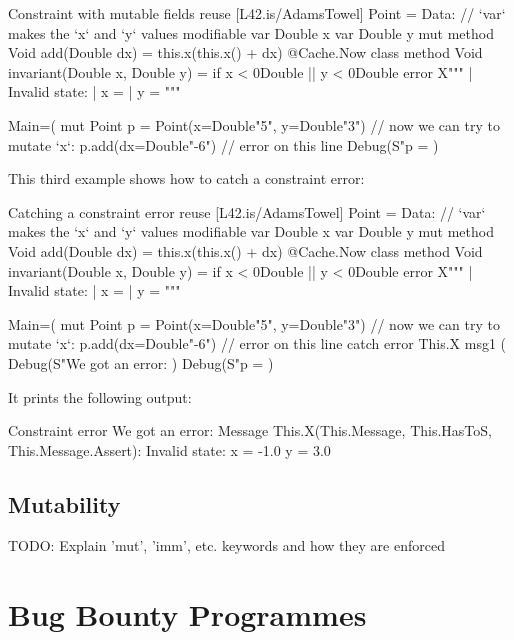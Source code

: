 \begin{mylisting}{Constraint with mutable fields}
reuse [L42.is/AdamsTowel]
Point = Data:{
  // `var` makes the `x` and `y` values modifiable
  var Double x
  var Double y
  mut method Void add(Double dx) = 
    this.x(this.x() + dx)
  @Cache.Now class method Void invariant(Double x, Double y) = 
    if x < 0Double || y < 0Double error X"""%
      | Invalid state:
      | x = %
      | y = %
      """
  }

Main=(
  mut Point p = Point(x=Double"5", y=Double"3")
  // now we can try to mutate `x`:
  p.add(dx=Double"-6") // error on this line
  Debug(S"p = %
  )
\end{mylisting}

This third example shows how to catch a constraint error:

\begin{mylisting}{Catching a constraint error}
reuse [L42.is/AdamsTowel]
Point = Data:{
  // `var` makes the `x` and `y` values modifiable
  var Double x
  var Double y
  mut method Void add(Double dx) = 
    this.x(this.x() + dx)
  @Cache.Now class method Void invariant(Double x, Double y) = 
    if x < 0Double || y < 0Double error X"""%
      | Invalid state:
      | x = %
      | y = %
      """
  }

Main=(
  mut Point p = Point(x=Double"5", y=Double"3")
  // now we can try to mutate `x`:
  p.add(dx=Double"-6") // error on this line
  catch error This.X msg1 (
     Debug(S"We got an error: %
     )
  Debug(S"p = %
  )
\end{mylisting}

It prints the following output:
\begin{mylisting}{Constraint error}
We got an error:
Message This.X(This.Message, This.HasToS, This.Message.Assert):
 Invalid state:
 x = -1.0
 y = 3.0

\end{mylisting}

\section{Mutability}

TODO: Explain 'mut', 'imm', etc. keywords and how they are enforced

\chapter{Bug Bounty Programmes}

